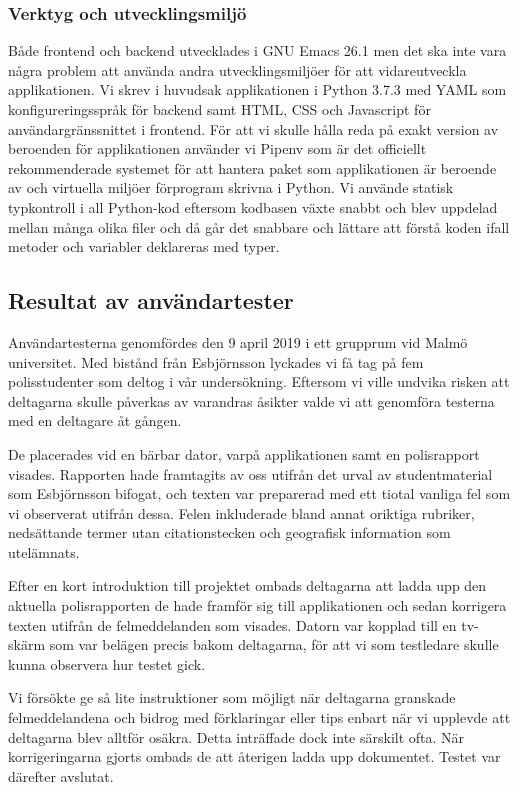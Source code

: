 \documentclass[swedish]{maucsthesis}
\begin{document}
\subsubsection{Verktyg och utvecklingsmiljö}

Både frontend och backend utvecklades i GNU Emacs 26.1 men det ska inte vara några
problem att använda andra utvecklingsmiljöer för att vidareutveckla
applikationen. Vi skrev i huvudsak applikationen i Python 3.7.3 med YAML som
konfigureringsspråk för backend samt HTML, CSS och Javascript för
användargränssnittet i frontend. För att vi skulle hålla reda på exakt version
av beroenden för applikationen använder vi Pipenv som är det officiellt
rekommenderade systemet för att hantera paket som applikationen är beroende av
och virtuella miljöer förprogram skrivna i Python. Vi använde statisk typkontroll
i all Python-kod eftersom kodbasen växte snabbt och blev uppdelad
mellan många olika filer och då går det snabbare och lättare att förstå
koden ifall metoder och variabler deklareras med typer.


\subsection{Resultat av användartester}

Användartesterna genomfördes den 9 april 2019 i ett grupprum vid Malmö
universitet. Med bistånd från Esbjörnsson lyckades vi få tag
på fem polisstudenter som deltog i vår undersökning. Eftersom vi ville undvika risken att
deltagarna skulle påverkas av varandras åsikter valde vi att genomföra testerna
med en deltagare åt gången.

De placerades vid en bärbar dator, varpå applikationen samt en polisrapport
visades. Rapporten hade framtagits av oss utifrån det urval av studentmaterial
som Esbjörnsson bifogat, och texten var preparerad med ett tiotal vanliga
fel som vi observerat utifrån dessa. Felen inkluderade bland annat oriktiga
rubriker, nedsättande termer utan citationstecken och geografisk information som
utelämnats.

Efter en kort introduktion till projektet ombads deltagarna att ladda upp den
aktuella polisrapporten de hade framför sig till applikationen och sedan
korrigera texten utifrån de felmeddelanden som visades. Datorn var kopplad till
en tv-skärm som var belägen precis bakom deltagarna, för att vi som
testledare skulle kunna observera hur testet gick.

Vi försökte ge så lite instruktioner som möjligt när deltagarna granskade
felmeddelandena och bidrog med förklaringar eller tips enbart när vi upplevde
att deltagarna blev alltför osäkra. Detta inträffade dock inte särskilt ofta.
När korrigeringarna gjorts ombads de att återigen ladda upp dokumentet. Testet
var därefter avslutat.
\end{document}
